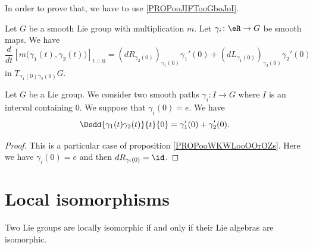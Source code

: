 In order to prove that, we have to use \ref{PROPooJIFTooGboJoI}.

\begin{proposition}	\label{PROPooWKWLooOOrOZs}
	Let \( G\) be a smooth Lie group with multiplication \( m\). Let \(\gamma_i \colon \eR\to G  \) be smooth maps. We have
	\begin{equation}
		\frac{d}{dt} \left[ m\big( \gamma_1(t),\gamma_2(t) \big)  \right]_{t=0}=(dR_{\gamma_2(0)})_{\gamma_1(0)}\gamma_1'(0)+(dL_{\gamma_1(0)})_{\gamma_2(0)}\gamma_2'(0)
	\end{equation}
	in \( T_{\gamma_1(0)\gamma_2(0)}G\).
\end{proposition}


\begin{proposition}     \label{PROPooAXYRooWVhXRa}
	Let \( G\) be a Lie group. We consider two smooth paths \( \gamma_i\colon I\to G\) where \( I\) is an interval containing \( 0\). We suppose that \( \gamma_i(0)=e\). We have
	\begin{equation}
		\Dsdd{ \gamma_1(t)\gamma_2(t) }{t}{0}=\gamma_1'(0)+\gamma_2'(0).
	\end{equation}
\end{proposition}

\begin{proof}
	This is a particular case of proposition \ref{PROPooWKWLooOOrOZs}. Here we have \( \gamma_i(0)=e\) and then \( dR_{\gamma_i(0)}=\id\).
\end{proof}


\section{Local isomorphisms}


\begin{theorem} \label{tho:loc_isom}
	Two Lie groups are locally isomorphic if and only if their Lie algebras are isomorphic.
\end{theorem}

